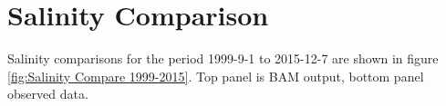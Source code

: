 \section{Salinity Comparison}
\label{sec:Salinity Comparison}
Salinity comparisons for the period 1999-9-1 to 2015-12-7 are shown in figure \ref{fig:Salinity Compare 1999-2015}. Top panel is BAM output, bottom panel observed data.
\begin{figure}[H]
  

\end{figure}
